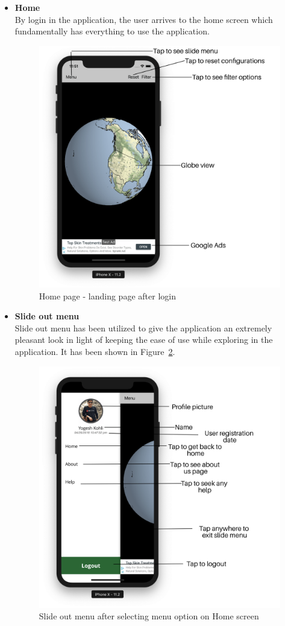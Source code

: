 \begin{itemize}
    
    \item \textbf{Home} \\
    By login in the application, the user arrives to the home screen which fundamentally has everything to use the application.
    
    \begin{figure}[H]
            \centering
            \includegraphics[width=0.5\linewidth]{figures/ch2/home.png}
            \caption{\label{fig:home_screen} Home page - landing page after login}
    \end{figure}
    

    \item \textbf{Slide out menu} \\
    Slide out menu has been utilized to give the application an extremely pleasant look in light of keeping the ease of use while exploring in the application. It has been shown in Figure~\ref{fig:side_menu}.
    
     \begin{figure}[H]
            \centering
            \includegraphics[width=0.50\linewidth]{figures/ch2/side_menu.png}
            \caption{\label{fig:side_menu} Slide out menu after selecting menu option on Home screen}
    \end{figure}
    

\end{itemize}
